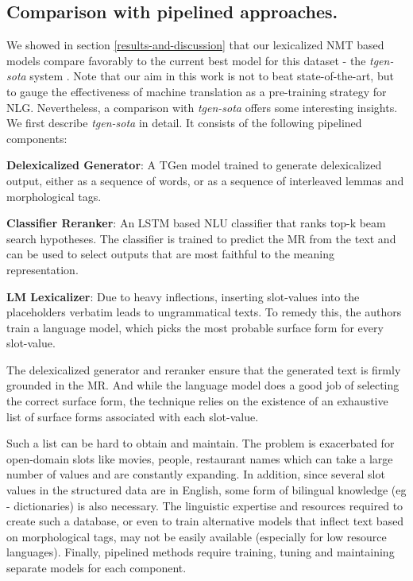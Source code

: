 \documentclass[11pt,a4paper]{article}
\begin{document}
\subsection{Comparison with pipelined approaches.} \label{pipelined}
We showed in section \ref{results-and-discussion} that our lexicalized NMT based models compare favorably to the current best model for this dataset - the \textsl{tgen-sota} system \citep{duvsek2019neural}. Note that our aim in this work is not to beat state-of-the-art, but to gauge the effectiveness of machine translation as a pre-training strategy for NLG. Nevertheless, a comparison with  \textsl{tgen-sota} offers some interesting insights. We first describe \textsl{tgen-sota} in detail. It consists of the following pipelined components: \par
\textbf{Delexicalized Generator}: A TGen model trained to generate delexicalized output, either as a sequence of words, or as a sequence of interleaved lemmas and morphological tags. \par
\textbf{Classifier Reranker}: An LSTM based NLU classifier that ranks top-k beam search hypotheses. The classifier is trained to predict the MR from the text and can be used to select outputs that are most faithful to the meaning representation. \par
\textbf{LM Lexicalizer}: Due to heavy inflections, inserting slot-values into the placeholders verbatim leads to ungrammatical texts. To remedy this, the authors train a language model, which picks the most probable surface form for every slot-value. \par
The delexicalized generator and reranker ensure that the generated text is firmly grounded in the MR. 
And while the language model does a good job of selecting the correct surface form, the technique relies on the existence of an exhaustive list of surface forms associated with each slot-value. \par 
Such a list can be hard to obtain and maintain. The problem is exacerbated for open-domain slots like movies, people, restaurant names which can take a large number of values and are constantly expanding. In addition, since several slot values in the structured data are in English, some form of bilingual knowledge (eg - dictionaries) is also necessary. The linguistic expertise and resources required to create such a database, or even to train alternative models that inflect text based on morphological tags, may not be easily available (especially for low resource languages). Finally, pipelined methods require training, tuning and maintaining separate models for each component. \par
\end{document}
